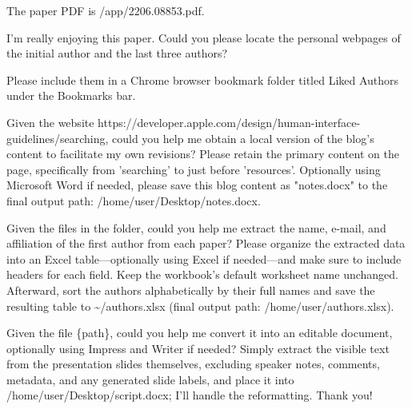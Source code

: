\documentclass{llmxive}
\begin{document}
\begin{instructionbox}
The paper PDF is \textasciigrave{}/app/2206.08853.pdf\textasciigrave{}.

I'm really enjoying this paper. Could you please locate the personal webpages of the initial author and the last three authors?

Please include them in a Chrome browser bookmark folder titled \textasciigrave{}Liked Authors\textasciigrave{} under the \textasciigrave{}Bookmarks bar\textasciigrave{}.
\end{instructionbox}

\begin{instructionbox}
Given the website \textasciigrave{}https://developer.apple.com/design/human-interface-guidelines/searching\textasciigrave{}, could you help me obtain a local version of the blog's content to facilitate my own revisions? Please retain the primary content on the page, specifically from 'searching' to just before 'resources'. Optionally using Microsoft Word if needed, please save this blog content as "notes.docx" to the final output path: \textasciigrave{}/home/user/Desktop/notes.docx\textasciigrave{}.
\end{instructionbox}

\begin{instructionbox}
Given the files in the folder, could you help me extract the name, e-mail, and affiliation of the first author from each paper? Please organize the extracted data into an Excel table---optionally using Excel if needed---and make sure to include headers for each field. Keep the workbook's default worksheet name unchanged. Afterward, sort the authors alphabetically by their full names and save the resulting table to \textasciigrave{}\textasciitilde{}/authors.xlsx\textasciigrave{} (final output path: \textasciigrave{}/home/user/authors.xlsx\textasciigrave{}).
\end{instructionbox}

\begin{instructionbox}
Given the file \{path\}, could you help me convert it into an editable document, optionally using Impress and Writer if needed? Simply extract the visible text from the presentation slides themselves, excluding speaker notes, comments, metadata, and any generated slide labels, and place it into \textasciigrave{}/home/user/Desktop/script.docx\textasciigrave{}; I'll handle the reformatting. Thank you!
\end{instructionbox}
\end{document}
